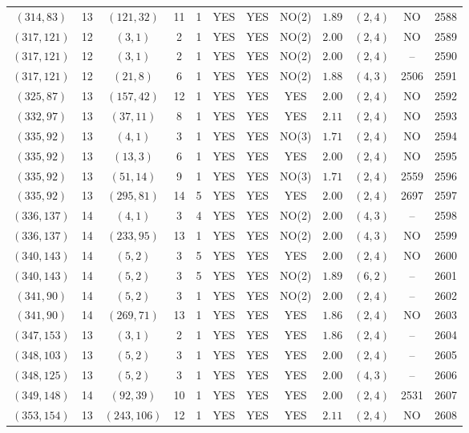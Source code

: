 \begin{longtable}{|c|c|c|c|c|c|c|c|c|c|c|c|}
$(314,83)$ & 13 & $(121,32)$ & 11 & 1 & YES & YES & NO(2) & $1.89$ & $(2,4)$ & NO & 2588\\
$(317,121)$ & 12 & $(3,1)$ & 2 & 1 & YES & YES & NO(2) & $2.00$ & $(2,4)$ & NO & 2589\\
$(317,121)$ & 12 & $(3,1)$ & 2 & 1 & YES & YES & NO(2) & $2.00$ & $(2,4)$ & -- & 2590\\
$(317,121)$ & 12 & $(21,8)$ & 6 & 1 & YES & YES & NO(2) & $1.88$ & $(4,3)$ & 2506 & 2591\\
$(325,87)$ & 13 & $(157,42)$ & 12 & 1 & YES & YES & YES & $2.00$ & $(2,4)$ & NO & 2592\\
$(332,97)$ & 13 & $(37,11)$ & 8 & 1 & YES & YES & YES & $2.11$ & $(2,4)$ & NO & 2593\\
$(335,92)$ & 13 & $(4,1)$ & 3 & 1 & YES & YES & NO(3) & $1.71$ & $(2,4)$ & NO & 2594\\
$(335,92)$ & 13 & $(13,3)$ & 6 & 1 & YES & YES & YES & $2.00$ & $(2,4)$ & NO & 2595\\
$(335,92)$ & 13 & $(51,14)$ & 9 & 1 & YES & YES & NO(3) & $1.71$ & $(2,4)$ & 2559 & 2596\\
$(335,92)$ & 13 & $(295,81)$ & 14 & 5 & YES & YES & YES & $2.00$ & $(2,4)$ & 2697 & 2597\\
$(336,137)$ & 14 & $(4,1)$ & 3 & 4 & YES & YES & NO(2) & $2.00$ & $(4,3)$ & -- & 2598\\
$(336,137)$ & 14 & $(233,95)$ & 13 & 1 & YES & YES & NO(2) & $2.00$ & $(4,3)$ & NO & 2599\\
$(340,143)$ & 14 & $(5,2)$ & 3 & 5 & YES & YES & YES & $2.00$ & $(2,4)$ & NO & 2600\\
$(340,143)$ & 14 & $(5,2)$ & 3 & 5 & YES & YES & NO(2) & $1.89$ & $(6,2)$ & -- & 2601\\
$(341,90)$ & 14 & $(5,2)$ & 3 & 1 & YES & YES & NO(2) & $2.00$ & $(2,4)$ & -- & 2602\\
$(341,90)$ & 14 & $(269,71)$ & 13 & 1 & YES & YES & YES & $1.86$ & $(2,4)$ & NO & 2603\\
$(347,153)$ & 13 & $(3,1)$ & 2 & 1 & YES & YES & YES & $1.86$ & $(2,4)$ & -- & 2604\\
$(348,103)$ & 13 & $(5,2)$ & 3 & 1 & YES & YES & YES & $2.00$ & $(2,4)$ & -- & 2605\\
$(348,125)$ & 13 & $(5,2)$ & 3 & 1 & YES & YES & YES & $2.00$ & $(4,3)$ & -- & 2606\\
$(349,148)$ & 14 & $(92,39)$ & 10 & 1 & YES & YES & YES & $2.00$ & $(2,4)$ & 2531 & 2607\\
$(353,154)$ & 13 & $(243,106)$ & 12 & 1 & YES & YES & YES & $2.11$ & $(2,4)$ & NO & 2608\\

\end{longtable}
